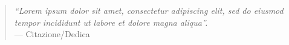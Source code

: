 \newpage
\thispagestyle{empty}
\vspace*{\fill}
\begin{quote}
\centering
\emph{``Lorem ipsum dolor sit amet, consectetur adipiscing elit, sed do eiusmod tempor incididunt ut labore et dolore magna aliqua''.}\\
\vspace*{2ex}
--- Citazione/Dedica
\end{quote}
\vspace*{\fill}

\begin{spacing}{1.0} %
\tableofcontents
\clearpage
\listoffigures
\clearpage
\listoftables
\end{spacing}